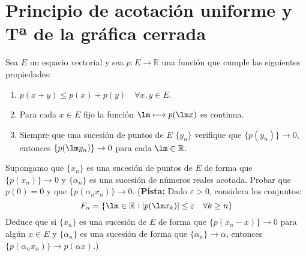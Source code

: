 \section{Principio de acotación uniforme y Tª de la gráfica cerrada}
\begin{ejercicio}
\end{ejercicio}

\begin{ejercicio}
    Sea $E$ un espacio vectorial y sea $p:E\to \mathbb{R}$ una función que cumple las siguientes propiedades:
    \begin{enumerate}
        \item $p(x+y)\leq p(x)+p(y)\quad \forall x,y\in E$.
        \item Para cada $x\in E$ fijo la función $\lm\longmapsto p(\lm x)$ es continua.
        \item Siempre que una sucesión de puntos de $E$ $\{y_n\}$ verifique que $\{p(y_n)\}\to 0$, entonces $\{p(\lm y_n)\}\to 0$ para cada $\lm \in \mathbb{R}$.
    \end{enumerate}
    Supongamo que $\{x_n\}$ es una sucesión de puntos de $E$ de forma que $\{p(x_n)\}\to 0$ y $\{\alpha_n\}$ es una sucesión de números reales acotada. Probar que $p(0)=0$ y que $\{p(\alpha_n x_n)\}\to 0$.\newline
    (\textbf{Pista:} Dado $\varepsilon>0$, considera los conjuntos:
    \begin{equation*}
        F_n = \{\lm \in \mathbb{R} : |p(\lm x_k)| \leq \varepsilon\quad \forall k\geq n\}
    \end{equation*}
    Deduce que si $\{x_n\}$ es una sucesión de $E$ de forma que $\{p(x_n-x)\}\to 0$ para algún $x\in E$ y $\{\alpha_n\}$ es una sucesión de forma que $\{\alpha_n\}\to \alpha$, entonces $\{p(\alpha_n x_n)\}\to p(\alpha x)$.)\\


\end{ejercicio}
